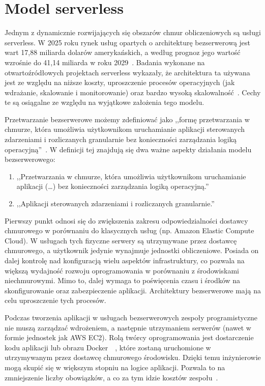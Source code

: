 \section{Model serverless}\label{chapter:model_serverless}
Jednym z dynamicznie rozwijających się obszarów chmur obliczeniowych są usługi serverless. 
W 2025 roku rynek usług opartych o architekturę bezserwerową jest wart 17,88 miliarda dolarów amerykańskich, 
a według prognoz jego wartość wzrośnie do 41,14 miliarda w roku 2029~\cite{serverlessArchitectureMarketReport}. 
Badania wykonane na otwartoźródłowych projektach serverless wykazały, 
że architektura ta używana jest ze względu na niższe koszty, uproszczenie procesów operacyjnych (jak wdrażanie, skalowanie i monitorowanie) 
oraz bardzo wysoką skalowalność~\cite{ServerlessApplicationsWhyWhenAndHow}. 
Cechy te są osiągalne ze względu na wyjątkowe założenia tego modelu.

Przetwarzanie bezserwerowe możemy zdefiniować jako 
,,formę przetwarzania w chmurze, która umożliwia użytkownikom uruchamianie aplikacji sterowanych zdarzeniami i rozliczanych granularnie bez konieczności zarządzania logiką operacyjną''~\cite{SpecRgCloudGroupVisionOnThePerformanceChallengesOfFaas}.
W definicji tej znajdują się dwa ważne aspekty działania modelu bezserwerowego:

\begin{enumerate}
    \item ,,Przetwarzania w chmurze, która umożliwia użytkownikom uruchamianie aplikacji (\dots) bez konieczności zarządzania logiką operacyjną.''
    \item ,,Aplikacji sterowanych zdarzeniami i rozliczanych granularnie.''
\end{enumerate}

Pierwszy punkt odnosi się do zwiększenia zakresu odpowiedzialności dostawcy chmurowego w porównaniu do klasycznych usług (np. Amazon Elastic Compute Cloud). 
W usługach tych fizyczne serwery są utrzymywane przez dostawcę chmurowego, a użytkownik jedynie wynajmuje jednostki obliczeniowe. 
Posiada on dalej kontrolę nad konfiguracją wielu aspektów infrastruktury, co pozwala na większą wydajność rozwoju oprogramowania w porównaniu z środowiskami niechmurowymi. 
Mimo to, dalej wymaga to poświęcenia czasu i środków na skonfigurowanie oraz zabezpieczenie aplikacji. 
Architektury bezserwerowe mają na celu uproszczenie tych procesów.

Podczas tworzenia aplikacji w usługach bezserwerowych zespoły programistyczne nie muszą zarządzać wdrożeniem, a następnie utrzymaniem serwerów (nawet w formie jednostek jak AWS EC2). 
Rolą twórcy oprogramowania jest dostarczenie kodu aplikacji lub obrazu Docker~\cite{awsLambdaDocs}~\cite{awsEcsDevGuide}, które zostaną uruchomione w utrzymywanym przez dostawcę chmurowego środowisku. 
Dzięki temu inżynierowie mogą skupić się w większym stopniu na logice aplikacji. 
Pozwala to na zmniejszenie liczby obowiązków, a co za tym idzie kosztów zespołu~\cite{riseOfThePlanetOfServerlessComputing}. 

